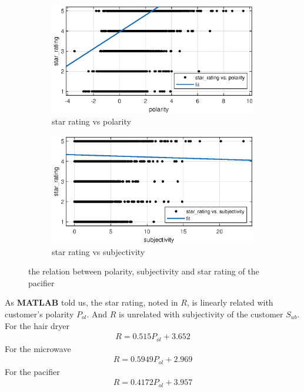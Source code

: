 \documentclass[12pt]{article}  %
\begin{document}
\begin{figure}[H]
  \centering
  \begin{subfigure}{.5\textwidth}
    \centering
    \includegraphics[width=\linewidth]{figures/pacifier/polarity_vs_star_rating.eps}
    \caption{star rating vs polarity}
    \label{fig:}
  \end{subfigure}%
  \begin{subfigure}{.5\textwidth}
    \centering
    \includegraphics[width=\linewidth]{figures/pacifier/subjectivity_vs_star_rating.eps}
    \caption{star rating vs subjectivity}
    \label{fig:}
  \end{subfigure}
  \caption{the relation between polarity, subjectivity and star rating of the pacifier}
  \label{fig:}
\end{figure}
As \textbf{MATLAB} told us, the star rating, noted in $R$, is linearly related with customer's polarity $P_{ol}$. And $R$ is unrelated with subjectivity of the customer $S_{ub}$. For the hair dryer
\begin{equation*}
  \begin{aligned}
    R = 0.515 P_{ol} + 3.652
  \end{aligned}
\end{equation*}
For the microwave
\begin{equation*}
  \begin{aligned}
    R = 0.5949 P_{ol} + 2.969
  \end{aligned}
\end{equation*}
For the pacifier
\begin{equation*}
  \begin{aligned}
    R = 0.4172 P_{ol} + 3.957
  \end{aligned}
\end{equation*}
\end{document}
